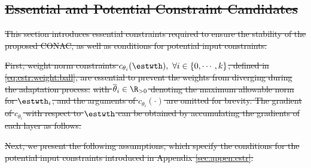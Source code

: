 \documentclass[letterpaper, journal]{IEEEtran}
\providecommand{\DIFdel}[1]{{\protect\color{red}\sout{#1}}} %
\providecommand{\DIFdelbegin}{} %
\begin{document}
\DIFdelbegin \subsection{\DIFdel{Essential and Potential Constraint Candidates}}%
\addtocounter{subsection}{-1}%

\DIFdel{This section introduces essential constraints required to ensure the stability of the proposed CONAC, as well as conditions for potential input constraints.
}%

\DIFdel{First, weight norm constraints $c_{\theta_i}(\estwth),\ \forall i\in\{0,\cdots ,k\}$, defined in \eqref{eq:cstr:weight:ball}, are essential to prevent the weights from diverging during the adaptation process:
}%
\DIFdel{with $\overline\theta_i\in\R_{>0}$ denoting the maximum allowable norm for $\estwth_i$, and the arguments of $c_{\theta_i}(\cdot)$ are omitted for brevity.
The gradient of $c_{\theta_i}$ with respect to $\estwth$ can be obtained by accumulating the gradients of each layer as follows:
}%

\DIFdel{Next, we present the following assumptions, which specify the conditions for the potential input constraints introduced in Appendix \ref{sec:appen:cstr}:
}%
\end{document}
